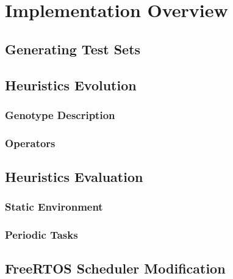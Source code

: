 \chapter{Implementation Overview}
\section{Generating Test Sets}
\section{Heuristics Evolution}
\subsection{Genotype Description}
\subsection{Operators}
\section{Heuristics Evaluation}
\subsection{Static Environment}
\subsection{Periodic Tasks}
\section{FreeRTOS Scheduler Modification}